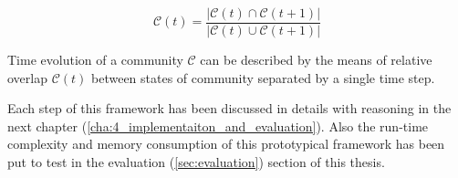 \begin{equation}
\mathcal{C}(t) = \dfrac{\lvert \mathcal{C}(t) \cap \mathcal{C}(t+1) \rvert}{\lvert \mathcal{C}(t) \cup \mathcal{C}(t+1) \rvert}
\end{equation}

Time evolution of a community $\mathcal{C}$ can be described by the means of relative overlap $\mathcal{C}(t)$ between states of community separated by a single time step.

Each step of this framework has been discussed in details with reasoning in the next chapter (\ref{cha:4_implementaiton_and_evaluation}). Also the run-time complexity and memory consumption of this prototypical framework has been put to test in the evaluation (\ref{sec:evaluation}) section of this thesis.